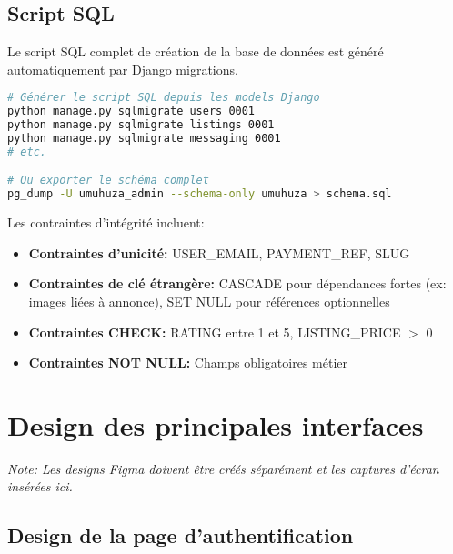 \subsection{Script SQL}

Le script SQL complet de création de la base de données est généré automatiquement par Django migrations.

\begin{lstlisting}[language=bash, caption=Génération du schéma SQL]
# Générer le script SQL depuis les models Django
python manage.py sqlmigrate users 0001
python manage.py sqlmigrate listings 0001
python manage.py sqlmigrate messaging 0001
# etc.

# Ou exporter le schéma complet
pg_dump -U umuhuza_admin --schema-only umuhuza > schema.sql
\end{lstlisting}

Les contraintes d'intégrité incluent:
\begin{itemize}
    \item \textbf{Contraintes d'unicité:} USER\_EMAIL, PAYMENT\_REF, SLUG
    \item \textbf{Contraintes de clé étrangère:} CASCADE pour dépendances fortes (ex: images liées à annonce), SET NULL pour références optionnelles
    \item \textbf{Contraintes CHECK:} RATING entre 1 et 5, LISTING\_PRICE $>$ 0
    \item \textbf{Contraintes NOT NULL:} Champs obligatoires métier
\end{itemize}

\section{Design des principales interfaces}

\textit{Note: Les designs Figma doivent être créés séparément et les captures d'écran insérées ici.}

\subsection{Design de la page d'authentification}

